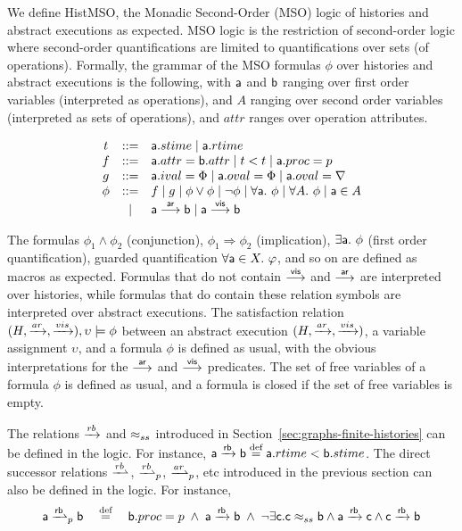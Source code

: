 
We define HistMSO, the Monadic Second-Order (MSO) logic of histories and abstract executions as expected. MSO logic is the restriction of second-order logic where second-order quantifications are limited to quantifications over sets (of operations). Formally, the grammar of the MSO formulas $\phi$ over histories and abstract executions is the following, with $\mathsf{a}$ and $\mathsf{b}$ ranging over first order variables (interpreted as operations), and $A$ ranging over second order variables (interpreted as sets of operations),
and $attr$ ranges over operation attributes.

$$
\begin{array}{ccl}
    t & ::= & \mathsf{a}.stime \mid \mathsf{a}.rtime \\
    f & ::= & \mathsf{a}.attr=\mathsf{b}.attr  \mid  t < t \mid \mathsf{a}.proc = p\\
    g & ::= & \mathsf{a}.ival=\Phi \mid \mathsf{a}.oval=\Phi \mid \mathsf{a}.oval=\nabla\\
    \phi & ::= & f \mid g \mid \phi\vee\phi \mid \neg \phi \mid \forall \mathsf{a}.\ \phi \mid \forall A.\ \phi \mid \mathsf{a} \in A \\
            & \mid & \mathsf{a} \stackrel{\mathsf{ar}}{\longrightarrow} \mathsf{b} \mid \mathsf{a} \stackrel{\mathsf{vis}}{\longrightarrow} \mathsf{b} 
\end{array}
$$

The formulas $\phi_1\wedge \phi_2$ (conjunction), $\phi_1\Rightarrow \phi_2$ (implication), $\exists \mathsf{a}.\ \phi$ (first order quantification), 
guarded quantification $\forall \mathsf{a} \in X.\ \varphi$,
and so on are defined as macros as expected.
Formulas that do not contain $\stackrel{\mathsf{vis}}{\longrightarrow}$ and $\stackrel{\mathsf{ar}}{\longrightarrow}$ are interpreted over histories, while formulas that do contain these relation symbols are interpreted over abstract executions. The satisfaction relation 
$(H,\xrightarrow{ar},\xrightarrow{vis}),\upsilon \models \phi$ between an abstract execution $(H,\xrightarrow{ar},\xrightarrow{vis})$, a variable assignment $\upsilon$, and a formula $\phi$ is defined as usual, with the obvious interpretations for the $\stackrel{\mathsf{ar}}{\longrightarrow}$ and $\stackrel{\mathsf{vis}}{\longrightarrow}$ predicates.
The set of free variables of a formula $\phi$ is defined as usual, and a formula is closed if the set of free variables is empty.


\begin{remark}
    The relations $\xrightarrow{rb}$ and $\approx_{ss}$ introduced in Section~\ref{sec:graphs-finite-histories} can be defined in the logic. For instance, $\mathsf{a}\xrightarrow{\mathsf{rb}}\mathsf{b} \stackrel{\text{def}}{=} \mathsf{a}.rtime<\mathsf{b}.stime$.
    The direct successor relations $\dsuc$, $\dsucp{p}$, $\succrl{p}{ar}$, etc introduced in the previous section can also be defined in the logic.
    For instance, 
    $$
        \varopa\succrl{p}{\mathsf{rb}}\varopb \quad \eqdef \quad \varopb.proc=p \;\land\; \varopa \logrl{rb}\varopb \;\land\;
            \neg\exists\varopc.\varopc\ssrel\varopb\land  \varopa\logrl{rb}\varopc  \land  \varopc\logrl{rb}\varopb
    $$
\end{remark}

